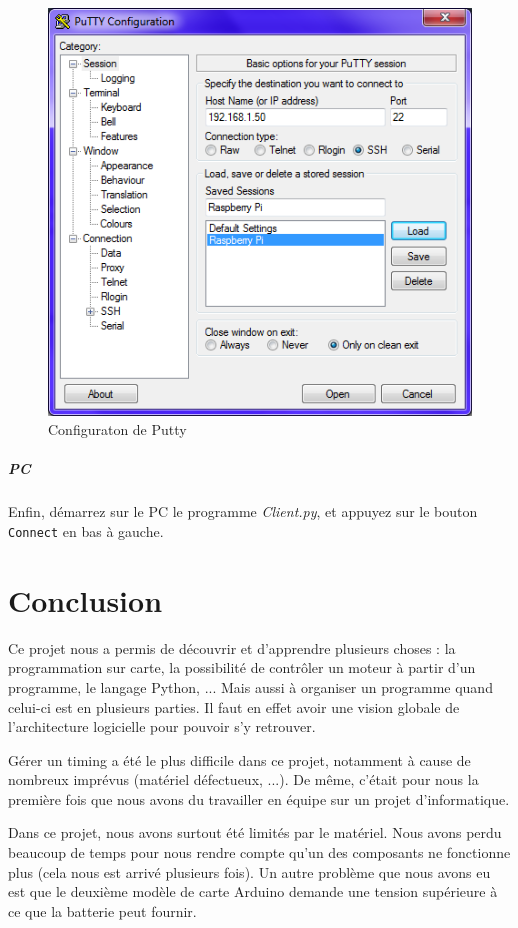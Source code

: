 \documentclass[12pt,a4paper]{report}
\begin{document}
\begin{figure}[hf!]
\center
\includegraphics[scale=0.7]{images/Screen/Putty.png}
\caption{Configuraton de Putty}
\end{figure}

\paragraph{PC} Enfin, démarrez sur le PC le programme \textit{Client.py}, et appuyez sur le bouton \verb=Connect= en bas à gauche.

\chapter{Conclusion}

Ce projet nous a permis de découvrir et d'apprendre plusieurs choses : la programmation sur carte, la possibilité de contrôler un moteur à partir d'un programme, le langage Python, ... Mais aussi à organiser un programme quand celui-ci est en plusieurs parties. Il faut en effet avoir une vision globale de l'architecture logicielle pour pouvoir s'y retrouver.

Gérer un timing a été le plus difficile dans ce projet, notamment à cause de nombreux imprévus (matériel défectueux, ...). De même, c'était pour nous la première fois que nous avons du travailler en équipe sur un projet d'informatique.

Dans ce projet, nous avons surtout été limités par le matériel. Nous avons perdu beaucoup de temps pour nous rendre compte qu'un des composants ne fonctionne plus (cela nous est arrivé plusieurs fois). Un autre problème que nous avons eu est que le deuxième modèle de carte Arduino demande une tension supérieure à ce que la batterie peut fournir.
\end{document}
